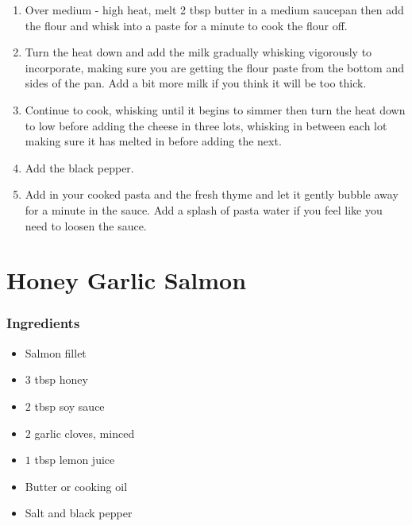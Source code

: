 \begin{enumerate}
    \item Over medium - high heat, melt 2 tbsp butter in a medium saucepan then add the flour and whisk into a paste for a minute to cook the flour off.
    \item Turn the heat down and add the milk gradually whisking vigorously to incorporate, making sure you are getting the flour paste from the bottom and sides of the pan. Add a bit more milk if you think it will be too thick.
    \item Continue to cook, whisking until it begins to simmer then turn the heat down to low before adding the cheese in three lots, whisking in between each lot making sure it has melted in before adding the next.
    \item Add the black pepper.
    \item Add in your cooked pasta and the fresh thyme and let it gently bubble away for a minute in the sauce. Add a splash of pasta water if you feel like you need to loosen the sauce.
\end{enumerate}

\section{Honey Garlic Salmon}
\subsubsection{Ingredients}
\begin{itemize}
    \item Salmon fillet
    \item $3$ tbsp honey
    \item $2$ tbsp soy sauce
    \item $2$ garlic cloves, minced
    \item $1$ tbsp lemon juice
    \item Butter or cooking oil
    \item Salt and black pepper
\end{itemize}

